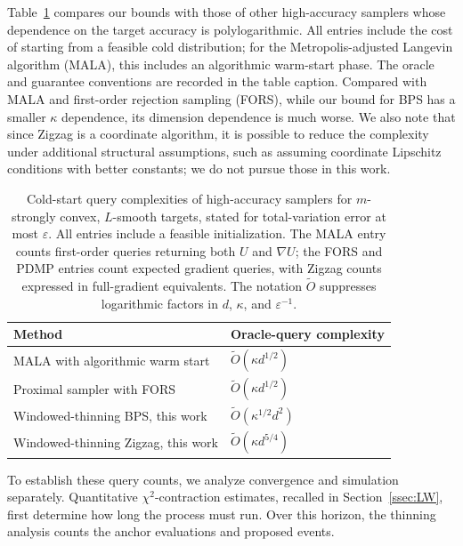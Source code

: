 \documentclass{amsart}
\theoremstyle{plain}
\theoremstyle{definition}
\theoremstyle{remark}
\newcommand{\1}{\mathbf 1}
\begin{document}
Table~\ref{tab:complexity-comparison} compares our bounds with those of other
high-accuracy samplers whose dependence on the target accuracy is
polylogarithmic.  All entries include the cost of starting from a feasible
cold distribution; for the Metropolis-adjusted Langevin algorithm (MALA),
this includes an algorithmic warm-start phase.  The oracle and guarantee conventions are recorded in the table caption. Compared with MALA and first-order rejection sampling (FORS), while our bound for BPS has a smaller $\kappa$ dependence, its dimension dependence is much worse. We also note that since Zigzag is a coordinate algorithm, it is possible to reduce the complexity under additional structural assumptions, such as assuming coordinate Lipschitz conditions with better constants; we do not pursue those in this work.  

\begin{table}[H]
\caption{Cold-start query complexities of high-accuracy samplers for
$m$-strongly convex, $L$-smooth targets, stated for total-variation error at
most $\varepsilon$.  All entries include a feasible initialization.  The MALA
entry counts first-order queries returning both $U$ and $\nabla U$; the FORS
and PDMP entries count expected gradient queries, with Zigzag counts expressed
in full-gradient equivalents.  The notation $\widetilde O$ suppresses
logarithmic factors in $d$, $\kappa$, and $\varepsilon^{-1}$.}
\label{tab:complexity-comparison}
\small
\centering
\begin{tabular}{@{}p{}p{}@{}}
\toprule
Method & Oracle-query complexity \\
\midrule
MALA with algorithmic warm start \cite{AltschulerChewi2024}
 & $\widetilde O(\kappa d^{1/2})$ \\
Proximal sampler with FORS \cite{ChenChewiDaskalakisRakhlin2026}
 & $\widetilde O(\kappa d^{1/2})$\\
Windowed-thinning BPS, this work
 & $\widetilde O(\kappa^{1/2}d^2)$ \\
Windowed-thinning Zigzag, this work
 & $\widetilde O(\kappa d^{5/4})$ \\
\bottomrule
\end{tabular}
\end{table}

\medskip

To establish these query counts, we analyze convergence and simulation
separately.  Quantitative $\chi^2$-contraction estimates, recalled in
Section~\ref{ssec:LW}, first determine how long the process must run.  Over
this horizon, the thinning analysis counts the anchor evaluations and
proposed events.
\end{document}
